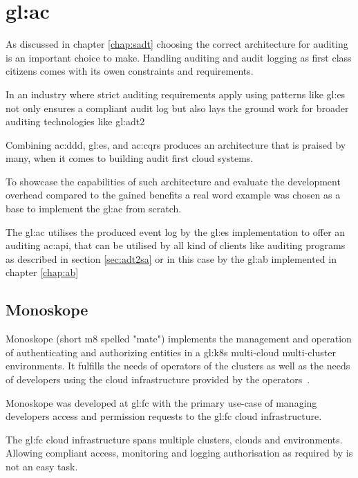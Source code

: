 %
\chapter{\gls{gl:ac}}\label{chap:ac}

As discussed in chapter \ref{chap:sadt} choosing the correct architecture for auditing is an important choice to make. Handling auditing and audit logging as first class citizens comes with its owen constraints and requirements.

In an industry where strict auditing requirements apply using patterns like \gls{gl:es} not only ensures a compliant audit log but also lays the ground work for broader auditing technologies like \gls{gl:adt2}

Combining \gls{ac:ddd}, \gls{gl:es}, and \gls{ac:cqrs} produces an architecture that is praised by many, when it comes to building audit first cloud systems.

To showcase the capabilities of such architecture and evaluate the development overhead compared to the gained benefits a real word example was chosen as a base to implement the \gls{gl:ac} from scratch.

The \gls{gl:ac} utilises the produced event log by the \gls{gl:es} implementation to offer an auditing \gls{ac:api}, that can be utilised by all kind of clients like auditing programs as described in section \ref{sec:adt2sa} or in this case by the \gls{gl:ab} implemented in chapter \ref{chap:ab}

\pagebreak

\section{Monoskope}\label{sec:m8}

Monoskope (short m8 spelled "mate") implements the management and operation of authenticating and authorizing entities in a \gls{gl:k8s} multi-cloud multi-cluster environments. It fulfills the needs of operators of the clusters as well as the needs of developers using the cloud infrastructure provided by the operators~\citep{monoskope}.

Monoskope was developed at \gls{gl:fc} with the primary use-case of managing developers access and permission requests to the \gls{gl:fc} cloud infrastructure. 

The \gls{gl:fc} cloud infrastructure spans multiple clusters, clouds and environments. Allowing compliant access, monitoring and logging authorisation as required by \citep{BaFinZAIT} is not an easy task.

